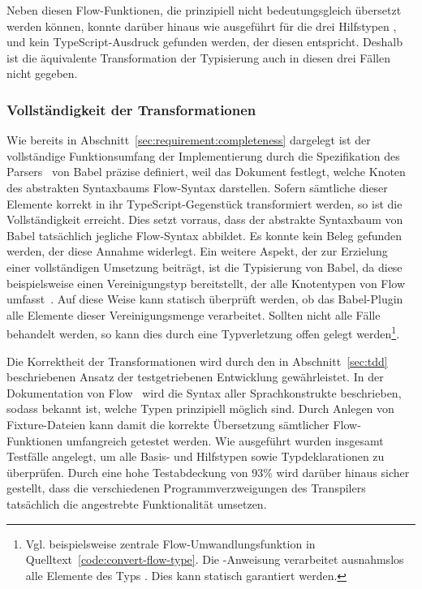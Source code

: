 Neben diesen Flow-Funktionen, die prinzipiell nicht bedeutungsgleich übersetzt werden können, konnte darüber hinaus wie ausgeführt für die drei Hilfstypen ,  und  kein TypeScript-Ausdruck gefunden werden, der diesen entspricht. Deshalb ist die äquivalente Transformation der Typisierung auch in diesen drei Fällen nicht gegeben.

\subsubsection{Vollständigkeit der Transformationen}

Wie bereits in Abschnitt~\ref{sec:requirement:completeness} dargelegt ist der vollständige Funktionsumfang der Implementierung durch die Spezifikation des Parsers~\autocite{BABEL:PARSER_SPEC} von Babel präzise definiert, weil das Dokument festlegt, welche Knoten des abstrakten Syntaxbaums Flow-Syntax darstellen. Sofern sämtliche dieser Elemente korrekt in ihr TypeScript-Gegenstück transformiert werden, so ist die Vollständigkeit erreicht. Dies setzt vorraus, dass der abstrakte Syntaxbaum von Babel tatsächlich jegliche Flow-Syntax abbildet. Es konnte kein Beleg gefunden werden, der diese Annahme widerlegt.
Ein weitere Aspekt, der zur Erzielung einer vollständigen Umsetzung beiträgt, ist die Typisierung von Babel, da diese beispielsweise einen Vereinigungstyp  bereitstellt, der alle Knotentypen von Flow umfasst~\autocite{BABEL:TYPES}. Auf diese Weise kann statisch überprüft werden, ob das Babel-Plugin alle Elemente dieser Vereinigungsmenge verarbeitet. Sollten nicht alle Fälle behandelt werden, so kann dies durch eine Typverletzung offen gelegt werden\footnote{Vgl. beispielsweise zentrale Flow-Umwandlungsfunktion in Quelltext~\ref{code:convert-flow-type}. Die -Anweisung verarbeitet ausnahmslos alle Elemente des Typs . Dies kann statisch garantiert werden.}.

Die Korrektheit der Transformationen wird durch den in Abschnitt~\ref{sec:tdd} beschriebenen Ansatz der testgetriebenen Entwicklung gewährleistet. In der Dokumentation von Flow~\autocite{FLOW:TYPE_ANNOTATIONS} wird die Syntax aller Sprachkonstrukte beschrieben, sodass bekannt ist, welche Typen prinzipiell möglich sind. Durch Anlegen von Fixture-Dateien kann damit die korrekte Übersetzung sämtlicher Flow-Funktionen umfangreich getestet werden. Wie ausgeführt wurden insgesamt \numberOfTests Testfälle angelegt, um alle Basis- und Hilfstypen sowie Typdeklarationen zu überprüfen. Durch eine hohe Testabdeckung von 93\% wird darüber hinaus sicher gestellt, dass die verschiedenen Programmverzweigungen des Transpilers tatsächlich die angestrebte Funktionalität umsetzen.


